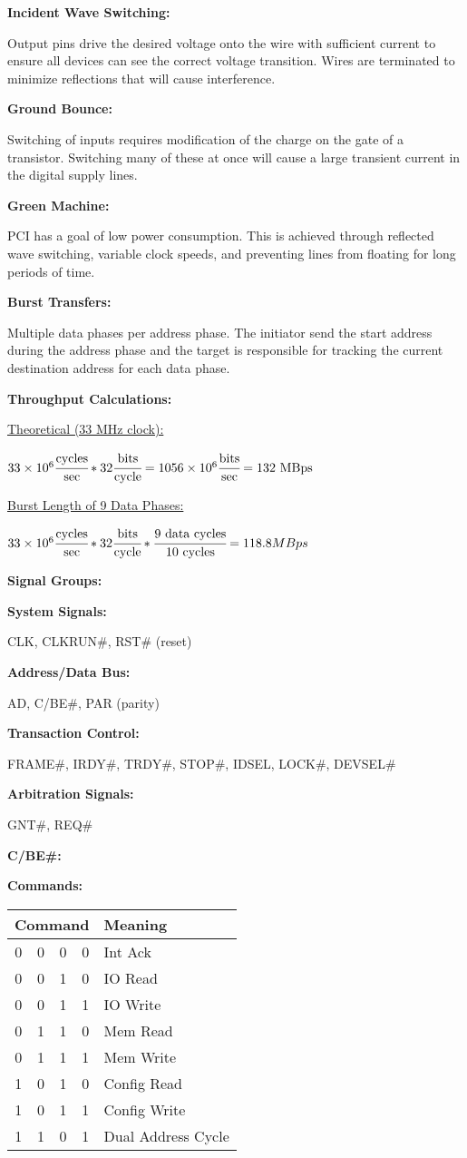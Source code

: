 \documentclass{article}
\newcommand{\ti}[1]{\hangindent=0.25in\noindent\begin{footnotesize}\textbf{#1:}\end{footnotesize}}
\newcommand{\hi}{\setlength\parindent{0.25in}\indent\hangindent=0.5in}
\begin{document}
\begin{footnotesize}
\begin{multicols*}{2}
	\ti{Incident Wave Switching} Output pins drive the desired voltage onto the wire with sufficient current to ensure all devices can see the correct voltage transition. Wires are terminated to minimize reflections that will cause interference.
	
	\ti{Ground Bounce} Switching of inputs requires modification of the charge on the gate of a transistor. Switching many of these at once will cause a large transient current in the digital supply lines. 
	
	\ti{Green Machine} PCI has a goal of low power consumption. This is achieved through reflected wave switching, variable clock speeds, and preventing lines from floating for long periods of time.
	
	\ti{Burst Transfers} Multiple data phases per address phase. The initiator send the start address during the address phase and the target is responsible for tracking the current destination address for each data phase.
	
	\ti{Throughput Calculations}
	
	\underline{Theoretical (33 MHz clock):} 
	
	$33\times 10^6 \cfrac{\text{cycles}}{\text{sec}} * 32 \cfrac{\text{bits}}{\text{cycle}} = 1056\times 10^6 \cfrac{\text{bits}}{\text{sec}} = 132 \text{ MBps}$
	
	\underline{Burst Length of 9 Data Phases:}
	
	$33\times 10^6 \cfrac{\text{cycles}}{\text{sec}} * 32 \cfrac{\text{bits}}{\text{cycle}} * \cfrac{9 \text{ data cycles}}{10 \text{ cycles}} = 118.8 MBps$
	
	\ti{Signal Groups}
	
		\hi\ti{System Signals} CLK, CLKRUN\#, RST\# (reset)
		
		\hi\ti{Address/Data Bus} AD, C/BE\#, PAR (parity)
		
		\hi\ti{Transaction Control} FRAME\#, IRDY\#, TRDY\#, STOP\#, IDSEL, LOCK\#, DEVSEL\#
		
		\hi\ti{Arbitration Signals} GNT\#, REQ\#
	
	\ti{C/BE\#}
	
		\hi\ti{Commands}
		
		\begin{tabular}{cccc|l}
		\multicolumn{4}{c}{Command} & Meaning \\\hline
		0 & 0 & 0 & 0 & Int Ack \\
		0 & 0 & 1 & 0 & IO Read \\
		0 & 0 & 1 & 1 & IO Write \\
		0 & 1 & 1 & 0 & Mem Read \\
		0 & 1 & 1 & 1 & Mem Write \\
		1 & 0 & 1 & 0 & Config Read \\
		1 & 0 & 1 & 1 & Config Write \\
		1 & 1 & 0 & 1 & Dual Address Cycle
		\end{tabular}
		

\end{multicols*}
\end{footnotesize}
\end{document}
